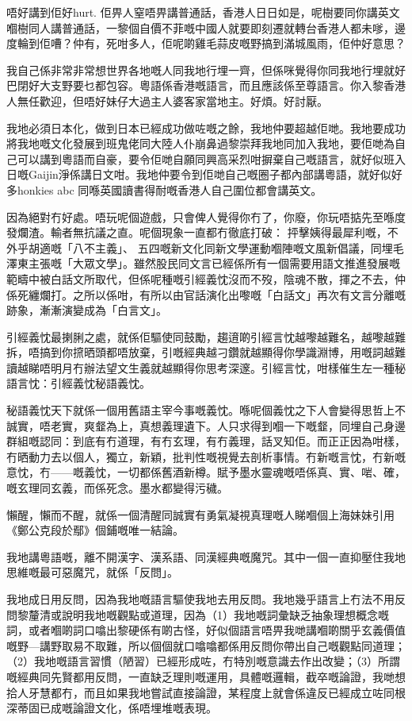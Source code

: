 \documentclass[a5paper, 10pt, openany]{book} %
\begin{document}
唔好講到佢好hurt. 佢畀人窒唔畀講普通話，香港人日日如是，呢樹要同你講英文嗰樹同人講普通話，一黎個自價不菲嘅中國人就要即刻遷就轉台香港人都未嗲，邊度輪到佢嘈？仲有，死咁多人，佢呢啲雞毛蒜皮嘅野搞到滿城風雨，佢仲好意思？

我自己係非常非常想世界各地嘅人同我地行埋一齊，但係咪覺得你同我地行埋就好巴閉好大支野要乜都包容。粵語係香港嘅語言，而且應該係至尊語言。你入黎香港人無任歡迎，但唔好妹仔大過主人婆客家當地主。好煩。好討厭。


我地必須日本化，做到日本已經成功做咗嘅之餘，我地仲要超越佢哋。我地要成功將我地嘅文化發展到班鬼佬同大陸人仆崩鼻過黎崇拜我地同加入我地，要佢哋為自己可以講到粵語而自豪，要令佢哋自願同興高采烈咁摒棄自己嘅語言，就好似班入日嘅Gaijin淨係講日文咁。我地仲要令到佢哋自己嘅圈子都內部講粵語，就好似好多honkies abc 同喺英國讀書得耐嘅香港人自己圍位都會講英文。



因為絕對冇好處。唔玩呢個遊戲，只會俾人覺得你冇了，你廢，你玩唔掂先至喺度發爛渣。輸者無抗議之直。呢個現象一直都冇徹底打破： 抨擊姨得最犀利嘅，不外乎胡適嘅「八不主義」、 五四嘅新文化同新文學運動嗰陣嘅文風新倡議，同埋毛澤東主張嘅「大眾文學」。雖然股民同文言已經係所有一個需要用語文推進發展嘅範疇中被白話文所取代，但係呢種嘅引經義忱沒而不歿，陰魂不散，揮之不去，仲係死纏爛打。之所以係咁，有所以由官話演化出嚟嘅「白話文」再次有文言分離嘅跡象，漸漸演變成為「白言文」。

引經義忱最揦脷之處，就係佢驅使同鼓勵，趨逳啲引經言忱越嚟越難名，越嚟越難拆，唔搞到你𢱑晒頭都唔放棄，引嘅經典越刁鑽就越顯得你學識淵博，用嘅詞越難讀越睇唔明月冇辦法望文生義就越顯得你思考深邃。引經言忱，咁樣催生左一種秘語言忱：引經義忱秘語義忱。

秘語義忱天下就係一個用舊語主宰今事嘅義忱。喺呢個義忱之下人會變得思哲上不誠實，唔老實，爽韰為上，真想義理遺下。人只求得到嗰一下嘅韰，同埋自己身邊群組嘅認同：到底有冇道理，有冇玄理，有冇義理，話叉知佢。而正正因為咁樣，冇晒動力去以個人，獨立，新穎，批判性嘅視覺去剖析事情。冇新嘅言忱，冇新嘅意忱，冇——嘅義忱，一切都係舊酒新樽。賦予墨水靈魂嘅唔係真、實、啱、確，嘅玄理同玄義，而係死念。墨水都變得污穢。

懶醒，懶而不醒，就係一個清醒同誠實有勇氣凝視真理嘅人睇嗰個上海妹妹引用《鄭公克段於鄢》個鋪嘅唯一結論。


我地講粵語嘅，離不開漢字、漢系語、同漢經典嘅魔咒。其中一個一直抑壓住我地思維嘅最可惡魔咒，就係「反問」。

我地成日用反問，因為我地嘅語言驅使我地去用反問。我地幾乎語言上冇法不用反問黎釐清或說明我地嘅觀點或道理，因為（1）我地嘅詞彙缺乏抽象理想概念嘅詞，或者嗰啲詞口噏出黎硬係有啲古怪，好似個語言唔畀我哋講嗰啲關乎玄義價值嘅野—講野取易不取難，所以個個就口噏噏都係用反問你帶出自己嘅觀點同道理；（2）我地嘅語言習慣（陋習）已經形成咗，冇特別嘅意識去作出改變；（3）所謂嘅經典同先賢都用反問，一直缺乏理則嘅運用，具體嘅邏輯，截卒嘅論證，我哋想拾人牙慧都冇，而且如果我地嘗試直接論證，某程度上就會係違反已經成立咗同根深蒂固已成嘅論證文化，係唔埋堆嘅表現。
\end{document}
